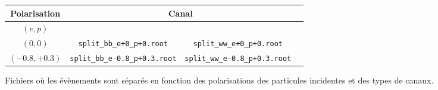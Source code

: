 

\begin{figure}[h!]
	\centering
	\begin{tabular}{ | c | c | c | c | }
		\hline
		Polarisation & \multicolumn{2}{c|}{Canal} \\
		\hline
		$(e,p)$ & \bb &  \WW \\
		\hline
		$(0,0)$ & \verb|split_bb_e+0_p+0.root| & \verb|split_ww_e+0_p+0.root| \\
		\hline \cline{2-3}
		$(-0.8, +0.3)$ & \verb|split_bb_e-0.8_p+0.3.root| & \verb|split_ww_e-0.8_p+0.3.root| \\
		\hline
	\end{tabular}
	\label{files:split}
	\caption{Fichiers où les évènements sont séparés en fonction des polarisations des particules incidentes et des types de canaux.}
\end{figure}
